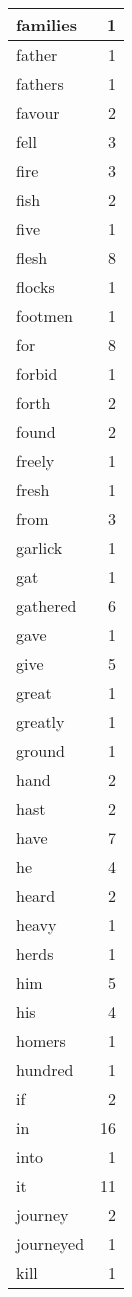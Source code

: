 \begin{center}
\begin{longtable}{l|r}
families & 1 \\ \hline
father & 1 \\ \hline
fathers & 1 \\ \hline
favour & 2 \\ \hline
fell & 3 \\ \hline
fire & 3 \\ \hline
fish & 2 \\ \hline
five & 1 \\ \hline
flesh & 8 \\ \hline
flocks & 1 \\ \hline
footmen & 1 \\ \hline
for & 8 \\ \hline
forbid & 1 \\ \hline
forth & 2 \\ \hline
found & 2 \\ \hline
freely & 1 \\ \hline
fresh & 1 \\ \hline
from & 3 \\ \hline
garlick & 1 \\ \hline
gat & 1 \\ \hline
gathered & 6 \\ \hline
gave & 1 \\ \hline
give & 5 \\ \hline
great & 1 \\ \hline
greatly & 1 \\ \hline
ground & 1 \\ \hline
hand & 2 \\ \hline
hast & 2 \\ \hline
have & 7 \\ \hline
he & 4 \\ \hline
heard & 2 \\ \hline
heavy & 1 \\ \hline
herds & 1 \\ \hline
him & 5 \\ \hline
his & 4 \\ \hline
homers & 1 \\ \hline
hundred & 1 \\ \hline
if & 2 \\ \hline
in & 16 \\ \hline
into & 1 \\ \hline
it & 11 \\ \hline
journey & 2 \\ \hline
journeyed & 1 \\ \hline
kill & 1 \\ \hline

\end{longtable}
\end{center}
